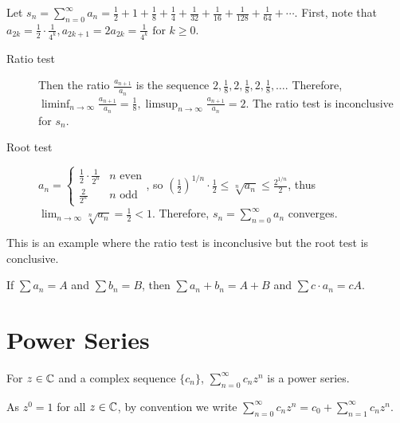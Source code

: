 \begin{example}
	\label{ex:3.35b}
	Let $s_{n}=\sum_{n=0}^{\infty}{a_{n}}=\frac{1}{2}+1+\frac{1}{8}+\frac{1}{4}+\frac{1}{32}+\frac{1}{16}+\frac{1}{128}+\frac{1}{64}+ \cdots$.
	First, note that $a_{2k}=\frac{1}{2}\cdot\frac{1}{4^{k}}, a_{2k+1}=2a_{2k}=\frac{1}{4^{k}} \text{ for } k \ge 0$.
	\begin{description}
		\item[Ratio test]
		      Then the ratio $\frac{a_{n+1}}{a_n}$ is the sequence $2, \frac{1}{8}, 2, \frac{1}{8},2, \frac{1}{8}, \ldots $. Therefore, $\liminf_{n\to \infty}{\frac{a_{n+1}}{a_{n}}}=\frac{1}{8}, \limsup_{n\to \infty}{\frac{a_{n+1}}{a_{n}}}=2$.
		      The ratio test is inconclusive for $s_{n}$.
		\item[Root test]
		      $a_{n}= \begin{cases}
				      \frac{1}{2} \cdot \frac{1}{2^{n}} & n \text{ even} \\
				      \frac{2}{2^{n}}                   & n \text{ odd}
			      \end{cases}
		      $, so $(\frac{1}{2})^{1/n}\cdot \frac{1}{2} \le  \sqrt[n]{a_{n}}\le \frac{2^{1/n}}{2}$, thus $\lim_{n\to \infty}{\sqrt[n]{a_{n}}}=\frac{1}{2}<1$. Therefore, $s_{n}=\sum_{n=0}^{\infty}{a_{n}}$ converges.
	\end{description}
	This is an example where the ratio test is inconclusive but the root test is conclusive.
\end{example}

\begin{thm}[47]
	If $\sum{a_{n}}=A$ and $\sum{b_{n}}=B$, then $\sum{a_{n} + b_{n}}=A+B$ and $\sum{c \cdot a_{n}}=c  A$.
\end{thm}

\section{Power Series}
\begin{definition}
	\label{def:3.38}
	For $z \in \mathbb{C}$ and a complex sequence $\{ {c}_{n}\}$, $\sum_{n=0}^{\infty}{c_{n}z^{n}}$ is a power series.
	\begin{remark}
		As $z^{0}=1$ for all $z \in \mathbb{C}$, by convention we write $\sum_{n=0}^{\infty}{c_{n}z^{n}}=c_0+\sum_{n=1}^{\infty}{c_{n}z^{n}}$.
	\end{remark}
\end{definition}

